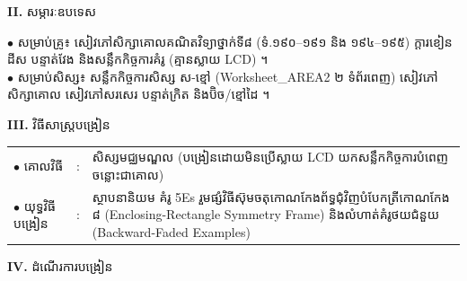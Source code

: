 \documentclass[a4paper,10pt]{article}
\newcommand{\en}[1]{{\TimesEn #1}}
\begin{document}
{%
\textbf{II.} {\muol សម្ភារៈឧបទេស}\\[1pt]
\hspace*{0.55cm}\parbox[t]{18.2cm}{$\bullet$ \hspace{0.25cm} សម្រាប់គ្រូ៖ សៀវភៅសិក្សាគោលគណិតវិទ្យាថ្នាក់ទី៨ (ទំ.១៩០--១៩១ និង ១៩៤--១៩៥) ក្ដារខៀន ដីស បន្ទាត់វែង និងសន្លឹកកិច្ចការគំរូ (គ្មានស្លាយ \en{LCD}) ។\\
$\bullet$ \hspace{0.25cm} សម្រាប់សិស្ស៖ សន្លឹកកិច្ចការសិស្ស ស-ខ្មៅ (\en{Worksheet\_AREA2} ២ ទំព័រពេញ) សៀវភៅសិក្សាគោល សៀវភៅសរសេរ បន្ទាត់ក្រិត និងប៊ិច/ខ្មៅដៃ ។}

\vspace{2pt}

\textbf{III.} {\muol វិធីសាស្រ្តបង្រៀន}\\[1pt]
\hspace*{0.45cm}%
\begin{tabular}{@{}l l L{14.85cm}@{}}
  $\bullet$ \hspace{0.25cm} គោលវិធី & : & សិស្សមជ្ឈមណ្ឌល (បង្រៀនដោយមិនប្រើស្លាយ \en{LCD} យកសន្លឹកកិច្ចការបំពេញចន្លោះជាគោល) \\
  $\bullet$ \hspace{0.25cm} យុទ្ធវិធីបង្រៀន & : & ស្ថាបនានិយម គំរូ \en{5Es} រួមផ្សំវិធីស៊ុមចតុកោណកែងព័ទ្ធជុំវិញបំបែកត្រីកោណកែង ៨ (\en{Enclosing-Rectangle Symmetry Frame}) និងលំហាត់គំរូថយជំនួយ (\en{Backward-Faded Examples}) \\
\end{tabular}
}

\vspace{2pt}

\textbf{IV.} {\muol ដំណើរការបង្រៀន}

\vspace{1pt}
\end{document}
